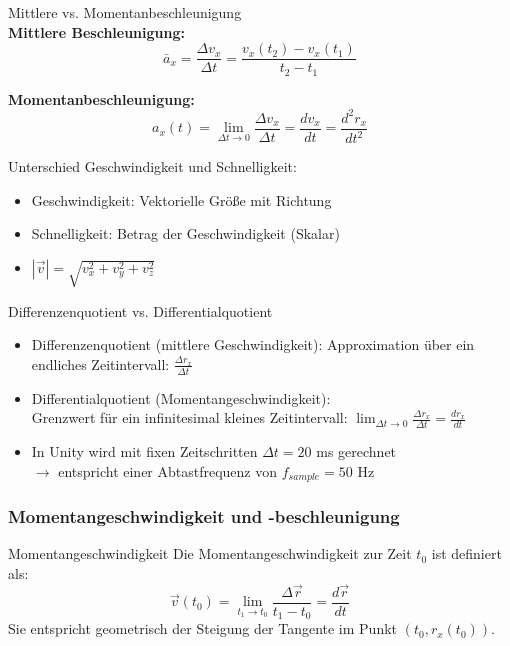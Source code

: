 \begin{definition}{Mittlere vs. Momentanbeschleunigung}\\
    \textbf{Mittlere Beschleunigung:}
    $$
        \bar{a}_x = \frac{\Delta v_x}{\Delta t} = \frac{v_x(t_2) - v_x(t_1)}{t_2 - t_1}
    $$
    
    \textbf{Momentanbeschleunigung:}
    $$
        a_x(t) = \lim_{\Delta t \to 0} \frac{\Delta v_x}{\Delta t} = \frac{dv_x}{dt} = \frac{d^2r_x}{dt^2}
    $$
\end{definition}

\multend

\begin{concept}{Unterschied Geschwindigkeit und Schnelligkeit:}
    \begin{itemize}
        \item Geschwindigkeit: Vektorielle Größe mit Richtung
        \item Schnelligkeit: Betrag der Geschwindigkeit (Skalar)
        \item $|\vec{v}| = \sqrt{v_x^2 + v_y^2 + v_z^2}$
    \end{itemize}
\end{concept}

\begin{theorem}{Differenzenquotient vs. Differentialquotient}
    \begin{itemize}
        \item Differenzenquotient (mittlere Geschwindigkeit): Approximation über ein endliches Zeitintervall: $\frac{\Delta r_x}{\Delta t}$
        \item Differentialquotient (Momentangeschwindigkeit): \\Grenzwert für ein infinitesimal kleines Zeitintervall: $\lim_{\Delta t \to 0} \frac{\Delta r_x}{\Delta t} = \frac{dr_x}{dt}$
        \item In Unity wird mit fixen Zeitschritten $\Delta t = 20$ ms gerechnet\\ $\rightarrow$ entspricht einer Abtastfrequenz von $f_{sample} = 50$ Hz 
    \end{itemize}
\end{theorem}

\subsubsection{Momentangeschwindigkeit und -beschleunigung}
\begin{definition}{Momentangeschwindigkeit}
    Die Momentangeschwindigkeit zur Zeit $t_0$ ist definiert als:
    $$
        \vec{v}(t_0) = \lim_{t_1 \to t_0} \frac{\Delta \vec{r}}{t_1 - t_0} = \frac{d\vec{r}}{dt}
    $$
    Sie entspricht geometrisch der Steigung der Tangente im Punkt $(t_0, r_x(t_0))$.
\end{definition}

